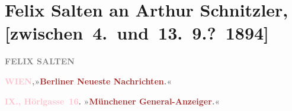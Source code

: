 

\renewcommand{\erwaehntePersonen}{Personen: Charlotte Pohl-Glas,  Reisner, Adele Reisner}
\renewcommand{\erwaehnteInstitutionen}{Institutionen: Berliner Neueste Nachrichten, Münchener General-Anzeiger}
\renewcommand{\erwaehnteOrte}{Orte: Hörlgasse, Wien}
\renewcommand{\erwaehnteWerke}{Werke: Tagebuch}
\section[Felix Salten an Arthur Schnitzler, {[}zwischen 4. und 13. 9.? 1894{]}]{Felix Salten an Arthur Schnitzler,
               {[}zwischen 4. und 13. 9.? 1894{]}}
\nopagebreak{}
\rehead{ }\normalsize\beginnumbering{}
\toendnotes[C]{\smallbreak\pagebreak[2]}
\toendnotes[C]{\smallbreak}
\pstart
           \noindent{}\centering{}{\pb}\textcolor{gray}{\textbf{FELIX SALTEN}}\pend
           
\pstart
           \noindent{}\textcolor{gray}{\textbf{\textcolor{pink}{WIEN}{}\ledrightnote{\textcolor{pink}{Wien}},}}\hfill \textcolor{gray}{\textbf{»\textcolor{brown}{Berliner Neueste
                        Nachrichten}{}\ledrightnote{\textcolor{brown}{Berliner Neueste Nachrichten}}.«}}\pend
           
\pstart
           \textcolor{gray}{\textbf{\textcolor{pink}{IX., Hörlgasse 16}{}\ledrightnote{\textcolor{pink}{Hörlgasse}}.}}\hfill \textcolor{gray}{\textbf{ »\textcolor{brown}{Münchener
                        General-Anzeiger}{}\ledrightnote{\textcolor{brown}{Münchener General-Anzeiger}}.«}}\pend
           
